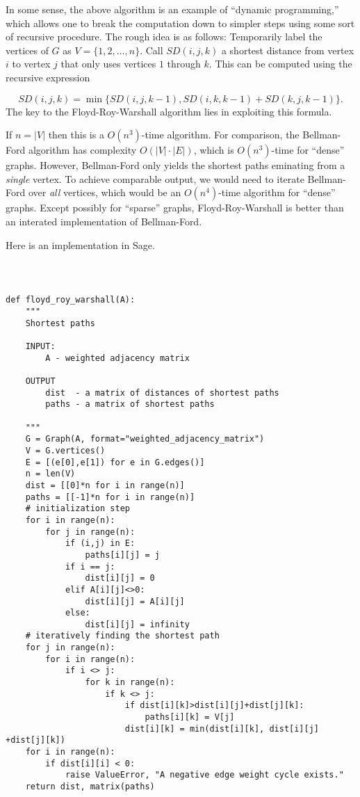 In some sense, the above algorithm is an example of 
``dynamic programming,'' which allows one to break the 
computation down to simpler steps using some sort of 
recursive procedure. 
The rough idea is as follows: Temporarily label the vertices of $G$
as $V=\{1,2,\dots,n\}$.
Call $SD(i,j,k)$ a shortest distance from vertex $i$ to 
vertex $j$ that only uses vertices $1$ through
$k$. This can be computed using the recursive
expression

\[
SD(i,j,k) = \min\{ SD(i,j,k-1), SD(i,k,k-1) + SD(k,j,k-1)\}.
\]
The key to the Floyd-Roy-Warshall algorithm 
lies in exploiting this formula.

If $n=|V|$ then this is a 
$O(n^3)$-time algorithm.
For comparison, the Bellman-Ford algorithm has complexity
$O(|V|\cdot |E|)$, which is $O(n^3)$-time for ``dense''
graphs. However, Bellman-Ford only yields the shortest
paths eminating from a {\it single} vertex.
To achieve comparable output, we would need to iterate
Bellman-Ford over {\it all} vertices, which would be an
 $O(n^4)$-time algorithm for ``dense'' graphs. Except
possibly for ``sparse'' graphs, Floyd-Roy-Warshall is better than
an interated implementation of Bellman-Ford.

Here is an implementation in Sage.
%
\begin{center}
\fontsize{9pt}{9pt}
\selectfont
\tt
\begin{lstlisting}

def floyd_roy_warshall(A):
    """
    Shortest paths

    INPUT: 
        A - weighted adjacency matrix 

    OUTPUT
        dist  - a matrix of distances of shortest paths
        paths - a matrix of shortest paths

    """
    G = Graph(A, format="weighted_adjacency_matrix")
    V = G.vertices()
    E = [(e[0],e[1]) for e in G.edges()]
    n = len(V)
    dist = [[0]*n for i in range(n)]
    paths = [[-1]*n for i in range(n)]
    # initialization step
    for i in range(n):
        for j in range(n):
            if (i,j) in E:
                paths[i][j] = j
            if i == j:
                dist[i][j] = 0
            elif A[i][j]<>0:
                dist[i][j] = A[i][j]
            else:
                dist[i][j] = infinity
    # iteratively finding the shortest path
    for j in range(n):
        for i in range(n):
            if i <> j:
                for k in range(n):
                    if k <> j:
                        if dist[i][k]>dist[i][j]+dist[j][k]:
                            paths[i][k] = V[j]
                        dist[i][k] = min(dist[i][k], dist[i][j] +dist[j][k])
    for i in range(n):
        if dist[i][i] < 0:
            raise ValueError, "A negative edge weight cycle exists."
    return dist, matrix(paths)   

\end{lstlisting}
\end{center}
%

